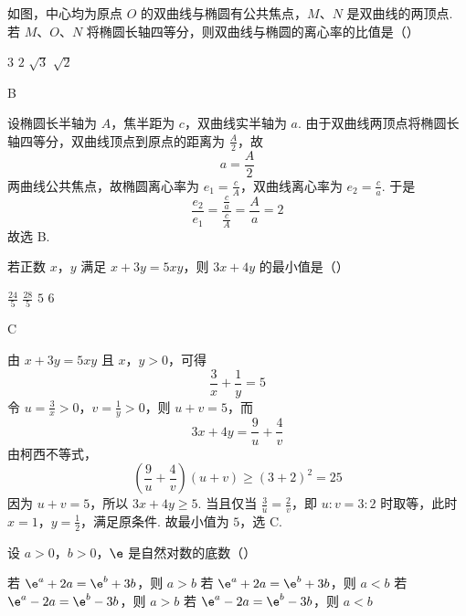 \begin{problem}
如图，中心均为原点 \(O\) 的双曲线与椭圆有公共焦点，\(M\)、\(N\) 是双曲线的两顶点. 若 \(M\)、\(O\)、\(N\) 将椭圆长轴四等分，则双曲线与椭圆的离心率的比值是（\quad）


\choices
    {\(3\)}
    {\(2\)}
    {\(\sqrt{3}\)}
    {\(\sqrt{2}\)}
\end{problem}

\begin{answer}
B
\end{answer}

\begin{solution}
设椭圆长半轴为 \(A\)，焦半距为 \(c\)，双曲线实半轴为 \(a\). 由于双曲线两顶点将椭圆长轴四等分，双曲线顶点到原点的距离为 \(\frac{A}{2}\)，故
\[
a=\frac A2
\]
两曲线公共焦点，故椭圆离心率为 \(e_1=\frac cA\)，双曲线离心率为 \(e_2=\frac ca\).
于是
\[
\frac{e_2}{e_1}=\frac{\frac{c}{a}}{\frac{c}{A}}=\frac Aa=2
\]
故选 B.
\end{solution}

\begin{problem}
若正数 \(x\)，\(y\) 满足 \(x + 3y = 5xy\)，则 \(3x + 4y\) 的最小值是（\quad）

\choices
    {\( \frac{24}{5} \)}
    {\( \frac{28}{5} \)}
    {\(5\)}
    {\(6\)}
\end{problem}

\begin{answer}
C
\end{answer}

\begin{solution}
由 \(x+3y=5xy\) 且 \(x\)，\(y>0\)，可得
\[
\frac3x+\frac1y=5
\]
令 \(u=\frac{3}{x}>0\)，\(v=\frac{1}{y}>0\)，则 \(u+v=5\)，而
\[
3x+4y=\frac9u+\frac4v
\]
由柯西不等式，
\[
\left(\frac9u+\frac4v\right)(u+v)\geq(3+2)^2=25
\]
因为 \(u+v=5\)，所以 \(3x+4y\geq5\). 当且仅当 \(\frac{3}{u}=\frac{2}{v}\)，即 \(u:v=3:2\) 时取等，此时 \(x=1\)，\(y=\frac12\)，满足原条件. 故最小值为 \(5\)，选 C.
\end{solution}

\begin{problem}
设 \(a > 0\)，\(b > 0\)，\(\e\) 是自然对数的底数（\quad）

\choices
    {若 \(\e^a + 2a = \e^b + 3b\)，则 \(a > b\)}
    {若 \(\e^a + 2a = \e^b + 3b\)，则 \(a < b\)}
    {若 \(\e^a - 2a = \e^b - 3b\)，则 \(a > b\)}
    {若 \(\e^a - 2a = \e^b - 3b\)，则 \(a < b\)}
\end{problem}

